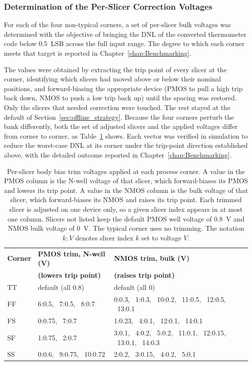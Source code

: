 \subsubsection{Determination of the Per-Slicer Correction Voltages}

For each of the four non-typical corners, a set of per-slicer bulk voltages
was determined with the objective of bringing the DNL of the converted
thermometer code below $0.5$~LSB across the full input range. The degree to
which each corner meets that target is reported in
Chapter~\ref{chap:Benchmarking}. 

The values were obtained by extracting the
trip point of every slicer at the corner, identifying which slicers had moved
above or below their nominal positions, and forward-biasing the appropriate
device (PMOS to pull a high trip back down, NMOS to push a low trip back up)
until the spacing was restored. Only the slicers that needed correction were touched. The rest
stayed at the default of Section~\ref{sec:offline_strategy}. Because the four
corners perturb the bank differently, both the set of adjusted slicers and the
applied voltages differ from corner to corner, as Table~\ref{tab:trimming_vectors}
shows. Each vector was verified in simulation to reduce the worst-case DNL at its
corner under the trip-point direction established above, with the detailed
outcome reported in Chapter~\ref{chap:Benchmarking}.

\begin{table}[htbp]
    \centering
    \caption{Per-slicer body bias trim voltages applied at each process corner. A value in the PMOS column is the N-well voltage of that slicer, which forward-biases its PMOS and lowers its trip point. A value in the NMOS column is the bulk voltage of that slicer, which forward-biases its NMOS and raises its trip point. Each trimmed slicer is adjusted on one device only, so a given slicer index appears in at most one column. Slicers not listed keep the default PMOS well voltage of $0.8$~V and NMOS bulk voltage of $0$~V. The typical corner uses no trimming. The notation $k\!:\!V$ denotes slicer index $k$ set to voltage $V$.}
    \label{tab:trimming_vectors}
    \renewcommand{\arraystretch}{1.4}
    \small
    \begin{tabular}{l p{4.7cm} p{4.7cm}}
        \toprule
        \textbf{Corner} & \textbf{PMOS trim, N-well (V)} & \textbf{NMOS trim, bulk (V)} \\
        & \textbf{(lowers trip point)} & \textbf{(raises trip point)} \\
        \midrule
        TT & default (all $0.8$) & default (all $0$) \\
        FF & 6:0.5, \ 7:0.5, \ 8:0.7 & 0:0.3, \ 1:0.3, \ 10:0.2, \ 11:0.5, \ 12:0.5, \ 13:0.1 \\
        FS & 0:0.75, \ 7:0.7 & 1:0.23, \ 4:0.1, \ 12:0.1, \ 14:0.1 \\
        SF & 1:0.75, \ 2:0.7 & 3:0.1, \ 4:0.2, \ 5:0.2, \ 11:0.1, \ 12:0.15, \ 13:0.1, \ 14:0.3 \\
        SS & 0:0.6, \ 9:0.75, \ 10:0.72 & 2:0.2, \ 3:0.15, \ 4:0.2, \ 5:0.1 \\
        \bottomrule
    \end{tabular}
\end{table}

